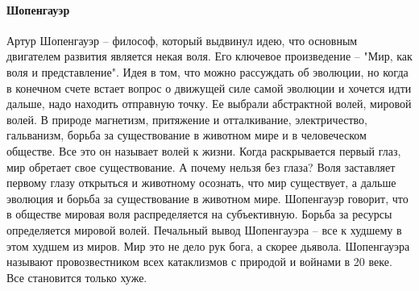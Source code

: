 \documentclass[a4paper, 12pt]{article}
\begin{document}
\paragraph{Шопенгауэр}Артур Шопенгауэр -- философ, который выдвинул идею, что основным двигателем развития является некая воля. Его ключевое произведение -- "Мир, как воля и представление". Идея в том, что можно рассуждать об эволюции, но когда в конечном счете встает вопрос о движущей силе самой эволюции и хочется идти дальше, надо находить отправную точку. Ее выбрали абстрактной волей, мировой волей. В природе магнетизм, притяжение и отталкивание, электричество, гальванизм, борьба за существование в животном мире и в человеческом обществе. Все это он называет волей к жизни. Когда раскрывается первый глаз, мир обретает свое существование. А почему нельзя без глаза? Воля заставляет первому глазу открыться и животному осознать, что мир существует, а дальше эволюция и борьба за существование в животном мире. Шопенгауэр говорит, что в обществе мировая воля распределяется на субъективную. Борьба за ресурсы определяется мировой волей. Печальный вывод Шопенгауэра -- все к худшему в этом худшем из миров. Мир это не дело рук бога, а скорее дьявола. Шопенгауэра называют провозвестником всех катаклизмов с природой и войнами в 20 веке. Все становится только хуже. 
\end{document}
